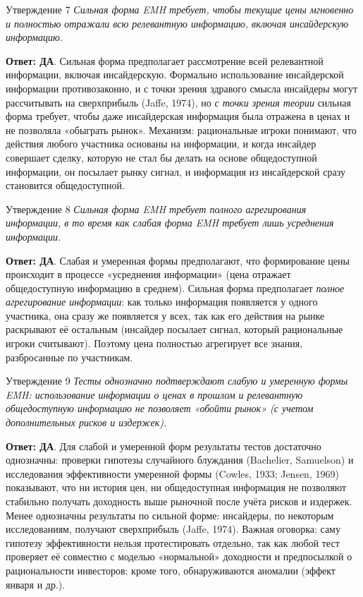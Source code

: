 \documentclass[10pt,a4paper]{article}
\newcommand{\qda}{\textbf{\color{yesgreen}Ответ: ДА}}
\newenvironment{answer}[2]{%
  \begin{qbox}{Утверждение #1}
  \textit{#2}\par\smallskip
}{%
  \end{qbox}\vspace{2pt}
}
\begin{document}
\begin{answer}{7}{Сильная форма EMH требует, чтобы текущие цены мгновенно и полностью отражали всю релевантную информацию, включая инсайдерскую информацию.}
\qda. Сильная форма предполагает рассмотрение всей релевантной информации, включая инсайдерскую. Формально использование инсайдерской информации противозаконно, и с точки зрения здравого смысла инсайдеры могут рассчитывать на сверхприбыль (Jaffe, 1974), но \emph{с точки зрения теории} сильная форма требует, чтобы даже инсайдерская информация была отражена в ценах и не позволяла «обыграть рынок». Механизм: рациональные игроки понимают, что действия любого участника основаны на информации, и когда инсайдер совершает сделку, которую не стал бы делать на основе общедоступной информации, он посылает рынку сигнал, и информация из инсайдерской сразу становится общедоступной.
\end{answer}

\begin{answer}{8}{Сильная форма EMH требует полного агрегирования информации, в то время как слабая форма EMH требует лишь усреднения информации.}
\qda. Слабая и умеренная формы предполагают, что формирование цены происходит в процессе «усреднения информации» (цена отражает общедоступную информацию в среднем). Сильная форма предполагает \emph{полное агрегирование информации}: как только информация появляется у одного участника, она сразу же появляется у всех, так как его действия на рынке раскрывают её остальным (инсайдер посылает сигнал, который рациональные игроки считывают). Поэтому цена полностью агрегирует все знания, разбросанные по участникам.
\end{answer}

\begin{answer}{9}{Тесты однозначно подтверждают слабую и умеренную формы EMH: использование информации о ценах в прошлом и релевантную общедоступную информацию не позволяет «обойти рынок» (с учетом дополнительных рисков и издержек).}
\qda. Для слабой и умеренной форм результаты тестов достаточно однозначны: проверки гипотезы случайного блуждания (Bachelier, Samuelson) и исследования эффективности умеренной формы (Cowles, 1933; Jensen, 1969) показывают, что ни история цен, ни общедоступная информация не позволяют стабильно получать доходность выше рыночной после учёта рисков и издержек. Менее однозначны результаты по сильной форме: инсайдеры, по некоторым исследованиям, получают сверхприбыль (Jaffe, 1974). Важная оговорка: саму гипотезу эффективности нельзя протестировать отдельно, так как любой тест проверяет её совместно с моделью «нормальной» доходности и предпосылкой о рациональности инвесторов; кроме того, обнаруживаются аномалии (эффект января и др.).
\end{answer}
\end{document}
